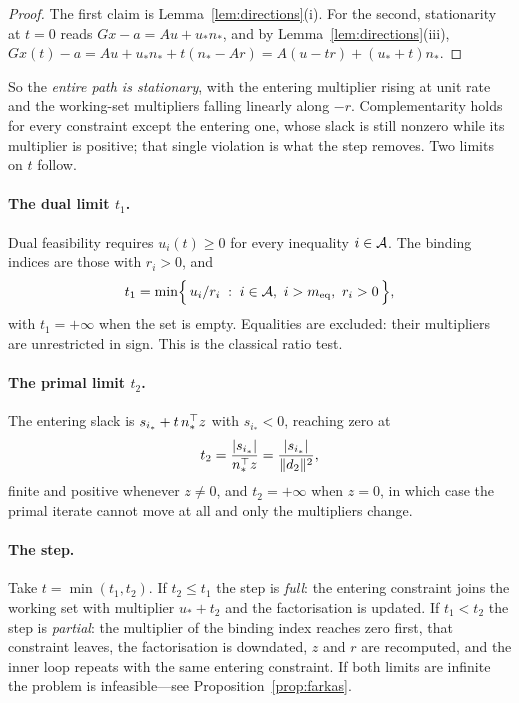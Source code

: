 \begin{proof}
The first claim is Lemma~\ref{lem:directions}(i). For the second, stationarity at
$t = 0$ reads $Gx - a = Au + u_* n_*$, and by Lemma~\ref{lem:directions}(iii),
$Gx(t) - a = Au + u_*n_* + t(n_* - Ar) = A(u-tr) + (u_*+t)n_*$.
\end{proof}

So the \emph{entire path is stationary}, with the entering multiplier rising at
unit rate and the working-set multipliers falling linearly along $-r$.
Complementarity holds for every constraint except the entering one, whose slack is
still nonzero while its multiplier is positive; that single violation is what the
step removes. Two limits on $t$ follow.

\paragraph{The dual limit $t_1$.} Dual feasibility requires $u_i(t) \ge 0$ for every
inequality $i \in \mathcal{A}$. The binding indices are those with $r_i > 0$, and
\begin{equation}
  t_1 = \min\Bigl\{\, u_i/r_i \;:\; i \in \mathcal{A},\ i > m_{\mathrm{eq}},\ r_i > 0 \,\Bigr\},
  \label{eq:t1}
\end{equation}
with $t_1 = +\infty$ when the set is empty. Equalities are excluded: their
multipliers are unrestricted in sign. This is the classical ratio test.

\paragraph{The primal limit $t_2$.} The entering slack is $s_{i_*} + t\,n_*^{\top} z$
with $s_{i_*} < 0$, reaching zero at
\begin{equation}
  t_2 = \frac{|s_{i_*}|}{n_*^{\top} z} = \frac{|s_{i_*}|}{\lVert d_2 \rVert^2},
  \label{eq:t2}
\end{equation}
finite and positive whenever $z \ne 0$, and $t_2 = +\infty$ when $z = 0$, in which
case the primal iterate cannot move at all and only the multipliers change.

\paragraph{The step.} Take $t = \min(t_1,t_2)$. If $t_2 \le t_1$ the step is
\emph{full}: the entering constraint joins the working set with multiplier
$u_* + t_2$ and the factorisation is updated. If $t_1 < t_2$ the step is
\emph{partial}: the multiplier of the binding index reaches zero first, that
constraint leaves, the factorisation is downdated, $z$ and $r$ are recomputed, and
the inner loop repeats with the same entering constraint. If both limits are
infinite the problem is infeasible---see Proposition~\ref{prop:farkas}.

